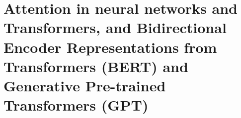 
\chapter{Attention in neural networks and Transformers, and Bidirectional Encoder Representations from Transformers (BERT) and Generative Pre-trained Transformers (GPT)}

